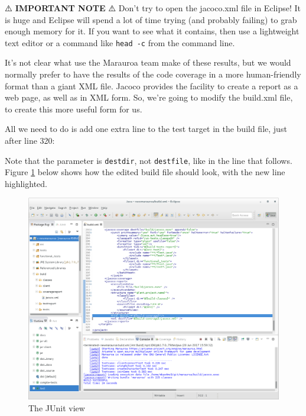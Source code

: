 \documentclass[
]{book}
\newenvironment{Shaded}{\begin{snugshade}}{\end{snugshade}}
\newcommand{\KeywordTok}[1]{\textcolor[rgb]{0.13,0.29,0.53}{\textbf{#1}}}
\newcommand{\OtherTok}[1]{\textcolor[rgb]{0.56,0.35,0.01}{#1}}
\newcommand{\StringTok}[1]{\textcolor[rgb]{0.31,0.60,0.02}{#1}}
\begin{document}
⚠️ \textbf{IMPORTANT NOTE} ⚠️
Don't try to open the jacoco.xml file in Eclipse! It is huge and Eclipse will spend a lot of time trying (and probably failing) to grab enough memory for it. If you want to see what it contains, then use a lightweight text editor or a command like \texttt{head\ -c} from the command line.

It's not clear what use the Marauroa team make of these results, but we would normally prefer to have the results of the code coverage in a more human-friendly format than a giant XML file. Jacoco provides the facility to create a report as a web page, as well as in XML form. So, we're going to modify the build.xml file, to create this more useful form for us.

All we need to do is add one extra line to the test target in the build file, just after line 320:

\begin{Shaded}
\end{Shaded}

Note that the parameter is \texttt{destdir}, not \texttt{destfile}, like in the line that follows. Figure \ref{fig:addHTMLreportRequestToBuildFile-fig} below shows how the edited build file should look, with the new line highlighted.

\begin{figure}

{\centering \includegraphics[width=1\linewidth]{images/3.3.5addHTMLreportRequestToBuildFile} 

}

\caption{The JUnit view}\label{fig:addHTMLreportRequestToBuildFile-fig}
\end{figure}
\end{document}
